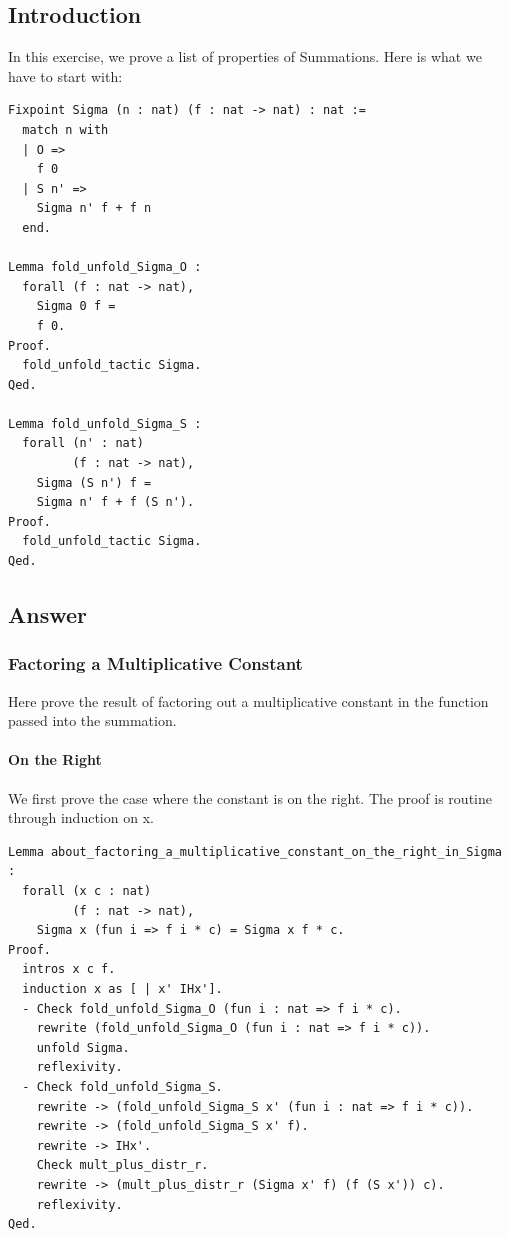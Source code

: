 \documentclass{article}
\begin{document}
\subsection{Introduction}
In this exercise, we prove a list of properties of Summations. Here is what we have to start with:

\begin{lstlisting}
Fixpoint Sigma (n : nat) (f : nat -> nat) : nat :=
  match n with
  | O =>
    f 0
  | S n' =>
    Sigma n' f + f n
  end.

Lemma fold_unfold_Sigma_O :
  forall (f : nat -> nat),
    Sigma 0 f =
    f 0.
Proof.
  fold_unfold_tactic Sigma.
Qed.

Lemma fold_unfold_Sigma_S :
  forall (n' : nat)
         (f : nat -> nat),
    Sigma (S n') f =
    Sigma n' f + f (S n').
Proof.
  fold_unfold_tactic Sigma.
Qed.
\end{lstlisting}

\subsection{Answer}
\subsubsection{Factoring a Multiplicative Constant}
Here prove the result of factoring out a multiplicative constant in the function passed into the summation.

\paragraph{On the Right}
We first prove the case where the constant is on the right. The proof is routine through induction on x.

\begin{lstlisting}
Lemma about_factoring_a_multiplicative_constant_on_the_right_in_Sigma :
  forall (x c : nat)
         (f : nat -> nat),
    Sigma x (fun i => f i * c) = Sigma x f * c.
Proof.
  intros x c f.
  induction x as [ | x' IHx'].
  - Check fold_unfold_Sigma_O (fun i : nat => f i * c).
    rewrite (fold_unfold_Sigma_O (fun i : nat => f i * c)).
    unfold Sigma.
    reflexivity.
  - Check fold_unfold_Sigma_S.
    rewrite -> (fold_unfold_Sigma_S x' (fun i : nat => f i * c)).
    rewrite -> (fold_unfold_Sigma_S x' f).
    rewrite -> IHx'.
    Check mult_plus_distr_r.
    rewrite -> (mult_plus_distr_r (Sigma x' f) (f (S x')) c).
    reflexivity.
Qed.
\end{lstlisting}
\end{document}
